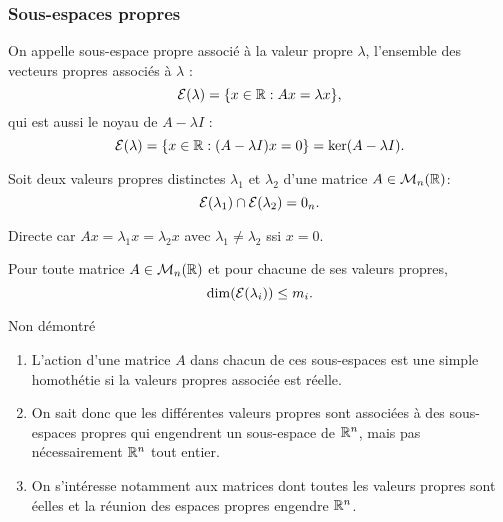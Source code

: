\subsubsection{Sous-espaces propres} 

\begin{definition}
  On appelle sous-espace propre associé à la valeur propre $\lambda$, l'ensemble des vecteurs propres associés à $\lambda$ :
  $$
  \mathcal{E}(\lambda) = \{x \in \mathbb{R}: Ax = \lambda x\},
  $$
  qui est aussi le noyau de $A - \lambda I$ : 
  $$
  \mathcal{E}(\lambda) = \{x \in \mathbb{R}: (A - \lambda I)x = 0\} = \ker(A - \lambda I).
  $$
\end{definition}

\begin{proposition}
  Soit deux valeurs propres distinctes $\lambda_1$ et $\lambda_2$ d'une matrice $A \in \mathcal{M}_n(\mathbb{R})$:
  $$
  \mathcal{E}(\lambda_1) \cap \mathcal{E}(\lambda_2) = 0_n.
  $$
\end{proposition}

\proof
Directe car $Ax = \lambda_1 x = \lambda_2 x$ avec $\lambda_1 \neq \lambda_2$ ssi $x = 0$.
\eproof


\begin{proposition}
  Pour toute matrice $A \in \mathcal{M}_n(\mathbb{R})$ et pour chacune de ses valeurs propres, 
  $$
  \dim(\mathcal{E}(\lambda_i)) \leq m_i.
  $$
\end{proposition}

\proof
Non démontré
\eproof

\remarks
\begin{enumerate}
  \item L'action d'une matrice $A$ dans chacun de ces sous-espaces est une simple homothétie si la valeurs propres associée est réelle.
  \item On sait donc que les différentes valeurs propres sont associées à des sous-espaces propres qui engendrent un sous-espace de $\mathbb{R}^n$, mais pas nécessairement $\mathbb{R}^n$ tout entier. 
  \item On s'intéresse notamment aux matrices dont toutes les valeurs propres sont éelles et la réunion des espaces propres engendre $\mathbb{R}^n$.
\end{enumerate}

